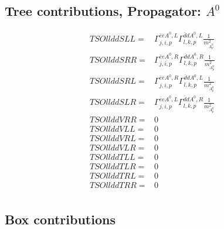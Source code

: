 \documentclass[A4,landscape]{article}
\begin{document}
\subsection{Tree contributions, Propagator: $A^0$} 

\begin{align} 
  TSOllddSLL= & \Gamma^{\bar{e}e A^0 ,L}_{j, i, p} \Gamma^{\bar{d}d A^0 ,L}_{l, k, p} \frac{1}{m^2_{A^0_{{p}}}} \\ 
  TSOllddSRR= & \Gamma^{\bar{e}e A^0 ,R}_{j, i, p} \Gamma^{\bar{d}d A^0 ,R}_{l, k, p} \frac{1}{m^2_{A^0_{{p}}}} \\ 
  TSOllddSRL= & \Gamma^{\bar{e}e A^0 ,R}_{j, i, p} \Gamma^{\bar{d}d A^0 ,L}_{l, k, p} \frac{1}{m^2_{A^0_{{p}}}} \\ 
  TSOllddSLR= & \Gamma^{\bar{e}e A^0 ,L}_{j, i, p} \Gamma^{\bar{d}d A^0 ,R}_{l, k, p} \frac{1}{m^2_{A^0_{{p}}}} \\ 
  TSOllddVRR= & 0 \\ 
  TSOllddVLL= & 0 \\ 
  TSOllddVRL= & 0 \\ 
  TSOllddVLR= & 0 \\ 
  TSOllddTLL= & 0 \\ 
  TSOllddTLR= & 0 \\ 
  TSOllddTRL= & 0 \\ 
  TSOllddTRR= & 0 \\ 
\end{align} 
\subsection{Box contributions} 
\end{document}
